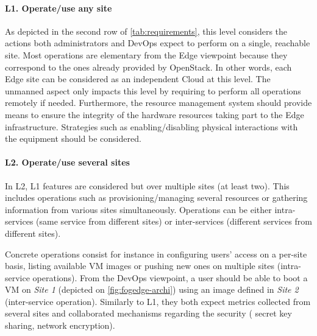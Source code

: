 \paragraph{L1. Operate/use any site}
As depicted in the second row of \cref{tab:requirements}, this level
considers the actions both administrators and DevOps expect to perform on a
single, reachable site.
%
Most operations are elementary from the Edge viewpoint because they correspond
to the ones already provided by OpenStack.
In other words, each Edge site can be considered as an independent Cloud at
this level. The unmanned aspect only impacts this level by requiring to perform
all operations remotely if needed.
Furthermore, the resource management system should provide means to
ensure the integrity of the hardware resources taking part to the Edge
infrastructure. Strategies such as enabling/disabling physical
interactions with the equipment should be considered.




\paragraph{L2. Operate/use several sites}

In L2, L1 features are considered but over multiple sites (at least two). This
includes operations such as provisioning/managing several resources or
gathering information from various sites simultaneously.
Operations can be either intra-services (same service from different sites) or
inter-services (different services from different sites).

Concrete operations consist for instance in configuring users'
access on a per-site basis, listing available VM images or pushing new
ones on multiple sites (intra-service operations). From the
DevOps viewpoint, a user should be able to boot a VM on \emph{Site 1} (depicted
on \cref{fig:fogedge-archi}) using an image defined in \emph{Site 2}
(inter-service operation). Similarly to L1, they both expect metrics collected
from several sites and collaborated mechanisms regarding the security (\eg
secret key sharing, network encryption).

